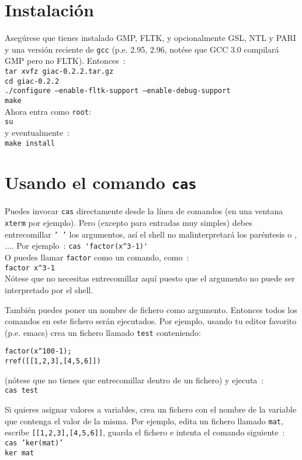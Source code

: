 \documentclass{article}
\begin{document}
\section{Instalaci\'on}
Aseg\'urese que tienes instalado GMP, FLTK, y opcionalmente GSL, NTL y PARI 
y una versi\'on reciente de {\tt gcc} (p.e. 2.95, 2.96, not\'ese
que GCC 3.0 compilar\'a GMP pero no FLTK).
Entonces~:\\
{\tt tar xvfz giac-0.2.2.tar.gz}\\
{\tt cd giac-0.2.2} \\
{\tt ./configure --enable-fltk-support --enable-debug-support} \\
{\tt make}\\
Ahora entra como {\tt root}:\\
{\tt su}\\
y eventualmente~:\\
{\tt make install}

\section{Usando el comando {\tt cas} }
Puedes invocar {\tt cas} directamente desde la l\'inea de comandos  (en una ventana {\tt xterm}
por ejemplo). Pero (excepto para entradas muy simples) debes
entrecomillar {\tt ' '} los argumentos, as\'i el shell no malinterpretar\'a los par\'entesis
o {\tt *}, ....
Por ejemplo~:
\verb|cas 'factor(x^3-1)'|\\
O puedes llamar \verb|factor| como un comando, como~:\\
\verb|factor x^3-1|\\
N\'otese que no necesitas entrecomillar aqu\'i puesto que el argumento no puede ser interpretado por el shell.

Tambi\'en puedes poner un nombre de fichero como argumento. Entonces todos los comandos en este fichero ser\'an ejecutados. Por ejemplo, usando tu editor favorito (p.e. emacs) crea un fichero llamado {\tt test} conteniendo:
\begin{verbatim}
factor(x^100-1);
rref([[1,2,3],[4,5,6]])
\end{verbatim}
(n\'otese que no tienes que entrecomillar dentro de un fichero) y ejecuta~:\\
{\tt cas test}

Si quieres asignar valores a variables, crea un fichero con el nombre de la variable que contenga el valor de la misma. Por ejemplo, edita un fichero llamado {\tt mat}, escribe {\tt [[1,2,3],[4,5,6]]}, guarda el fichero e intenta el comando siguiente~:\\
{\tt cas 'ker(mat)'}\\
{\tt ker mat}
\end{document}
